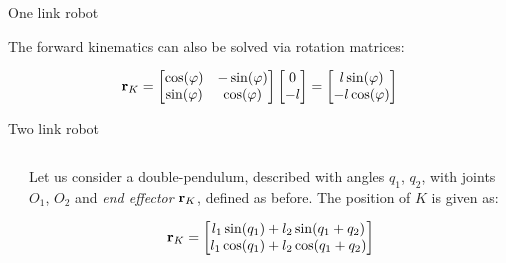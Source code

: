 \documentclass{beamer}
\begin{document}
\begin{frame}{One link robot}
	\begin{flushleft}
		
		The forward kinematics can also be solved via rotation matrices:
		
		\begin{equation}
			\mathbf{r}_K = 
			\begin{bmatrix} \cos(\varphi) & -\sin (\varphi) \\ \sin (\varphi) & \cos(\varphi) \end{bmatrix}
			\begin{bmatrix}
				0 \\ 
				-l 
			\end{bmatrix}
		=
			\begin{bmatrix}
				l \sin (\varphi) \\ 
				-l \cos (\varphi) 
			\end{bmatrix}
		\end{equation}
		
		
		
		
	\end{flushleft}
\end{frame}



\begin{frame}{Two link robot}
	\begin{flushleft}
		
	
		\begin{columns}
			\begin{column}{0.4\textwidth}
				
			\end{column}
			\begin{column}{0.6\textwidth}  %
				
					Let us consider a double-pendulum, described with angles $q_1$, $q_2$, with joints $O_1$, $O_2$ and \emph{end effector} $\mathbf{r}_K$, defined as before. The position of $K$ is given as:
				
					
					\begin{equation*}
						\mathbf{r}_K = \begin{bmatrix}
							l_1 \sin (q_1) + l_2 \sin (q_1+q_2) \\ 
							l_1 \cos (q_1) + l_2 \cos (q_1+q_2) 
						\end{bmatrix}
					\end{equation*}
				
			\end{column}
		\end{columns}
		
		
	\end{flushleft}
\end{frame}
\end{document}
